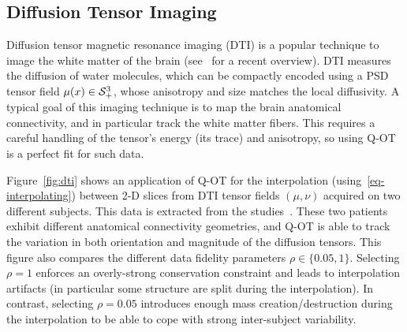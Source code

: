 



\subsection{Diffusion Tensor Imaging}

Diffusion tensor magnetic resonance imaging (DTI) is a popular technique to image the white matter of the brain (see~\cite{wandell2016clarifying} for a recent overview). DTI measures the diffusion of water molecules, which can be compactly encoded using a PSD tensor field $\mu(x) \in \mathcal{S}_+^3$, whose anisotropy and size matches the local diffusivity. 
%
A typical goal of this imaging technique is to map the brain anatomical connectivity, and in particular track the  white matter fibers. This requires a careful handling of the tensor's energy (its trace) and anisotropy, so using Q-OT is a perfect fit for such data.

Figure~\ref{fig:dti} shows an application of Q-OT for the interpolation (using~\ref{eq-interpolating}) between 2-D slices from DTI tensor fields $(\mu,\nu)$ acquired on two different subjects. This data is extracted from the studies~\cite{pestilli2014evaluation,takemura2016ensemble}. These two patients exhibit different anatomical connectivity geometries, and Q-OT is able to track the variation in both orientation and magnitude of the diffusion tensors. This figure also compares the different data fidelity parameters $\rho \in \{0.05,1\}$. Selecting $\rho=1$ enforces an overly-strong conservation constraint and leads to interpolation artifacts (in particular some structure are split during the interpolation). In contrast, selecting $\rho=0.05$ introduces enough mass creation/destruction during the interpolation to be able to cope with strong inter-subject variability.

\newcommand{\DTIimg}[1]{\texttt{[image: dti/\#1]}}

